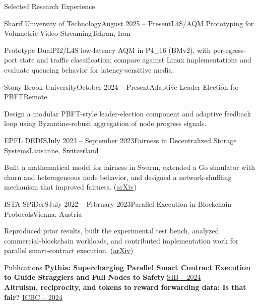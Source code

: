 \documentclass[11pt]{resume}
\begin{document}
\begin{rSection}{Selected Research Experience}
  \vspace{4pt}
  \begin{rSubsection}{Sharif University of Technology}{August 2025 -- Present}{L4S/AQM Prototyping for Volumetric Video Streaming}{Tehran, Iran}
    \item Prototype DualPI2/L4S low-latency AQM in P4\_16 (BMv2), with per-egress-port state and traffic classification; compare against Linux implementations and evaluate queueing behavior for latency-sensitive media.
  \end{rSubsection}
  \begin{rSubsection}{Stony Brook University}{October 2024 -- Present}{Adaptive Leader Election for PBFT}{Remote}
    \item Design a modular PBFT-style leader-election component and adaptive feedback loop using Byzantine-robust aggregation of node progress signals.
  \end{rSubsection}
  \begin{rSubsection}{EPFL DEDIS}{July 2023 -- September 2023}{Fairness in Decentralized Storage Systems}{Lausanne, Switzerland}
    \item Built a mathematical model for fairness in Swarm, extended a Go simulator with churn and heterogeneous node behavior, and designed a network-shuffling mechanism that improved fairness. (\href{https://arxiv.org/abs/2307.02231}{arXiv})
  \end{rSubsection}
  \begin{rSubsection}{ISTA SPiDerS}{July 2022 -- February 2023}{Parallel Execution in Blockchain Protocols}{Vienna, Austria}
    \item Reproduced prior results, built the experimental test bench, analyzed commercial-blockchain workloads, and contributed implementation work for parallel smart-contract execution. (\href{https://arxiv.org/abs/2401.14278}{arXiv})
  \end{rSubsection}
\end{rSection}

\begin{rSection}{Publications}
  \vspace{4pt}
  \textbf{Pythia: Supercharging Parallel Smart Contract Execution to Guide Stragglers and Full Nodes to Safety} \hfill \href{https://arxiv.org/abs/2401.14278}{SIB -- 2024}\\
  \textbf{Altruism, reciprocity, and tokens to reward forwarding data: Is that fair?} \hfill \href{https://arxiv.org/abs/2307.02231}{ICBC -- 2024}
\end{rSection}
\end{document}
